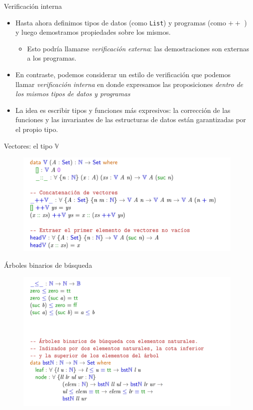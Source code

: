 \documentclass[11pt]{beamer}
\newcommand{\bit}{\begin{itemize}\setlength\itemsep{1em}}
\newcommand{\biti}{\begin{itemize}\setlength\itemsep{0.3em}}
\newcommand{\eit}{\end{itemize}}
\begin{document}
\begin{frame}{Verificación interna}

\bit
\item Hasta ahora definimos tipos de datos (como \texttt{List}) y programas (como $++$ ) y luego demostramos propiedades sobre los mismos. 

\biti
\item Esto podría llamarse \textit{verificación externa}: las demostraciones son externas a los programas.
\eit


\item En contraste, podemos considerar un estilo de verificación que podemos llamar \textit{verificación interna} en donde expresamos las proposiciones \textit{dentro de los mismos tipos de datos y programas}

\item La idea es escribir tipos y funciones más expresivos: la corrección de las funciones y las invariantes de las estructuras de datos están garantizadas por el propio tipo.

\eit
\end{frame}

\begin{frame}{Vectores: el tipo $\mathbb{V}$}
\begin{figure}
\includegraphics[scale=0.6]{img/vector-vi}
\end{figure}

\end{frame}


\begin{frame}{Árboles binarios de búsqueda}
\begin{figure}
\includegraphics[scale=0.55]{img/bst}
\end{figure}

\end{frame}
\end{document}
